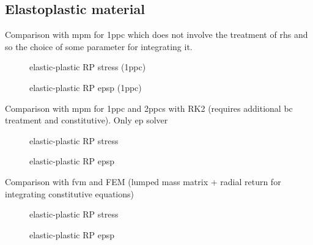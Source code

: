 \subsection{Elastoplastic material}
Comparison with mpm for 1ppc which does not involve the treatment of rhs and so the choice of some parameter for integrating it.
\begin{figure}[h!]
  \centering
  {}
  {}
  {}
  \caption{elastic-plastic RP stress (1ppc)}
  \label{fig:stress_elastoplastic_RP}
\end{figure}
\begin{figure}[h!]
  \centering
  {}
  {}
  {}
  \caption{elastic-plastic RP epsp (1ppc)}
  \label{fig:epsp_elastoplastic_RP}
\end{figure}
Comparison with mpm for 1ppc and 2ppcs with RK2 (requires additional bc treatment and constitutive). Only ep solver
\begin{figure}[h!]
  \centering
  {}
  {}
  {}
  \caption{elastic-plastic RP stress}
  \label{fig:stress_elastoplastic_RP}
\end{figure}
\begin{figure}[h!]
  \centering
  {}
  {}
  {}
  \caption{elastic-plastic RP epsp}
  \label{fig:epsp_elastoplastic_RP}
\end{figure}


Comparison with fvm and FEM (lumped mass matrix + radial return for integrating constitutive equations)
\begin{figure}[h!]
  \centering
  {}
  {}
  {}
  \caption{elastic-plastic RP stress}
  \label{fig:stress_elastoplastic_RP}
\end{figure}
\begin{figure}[h!]
  \centering
  {}
  {}
  {}
  \caption{elastic-plastic RP epsp}
  \label{fig:epsp_elastoplastic_RP}
\end{figure}


